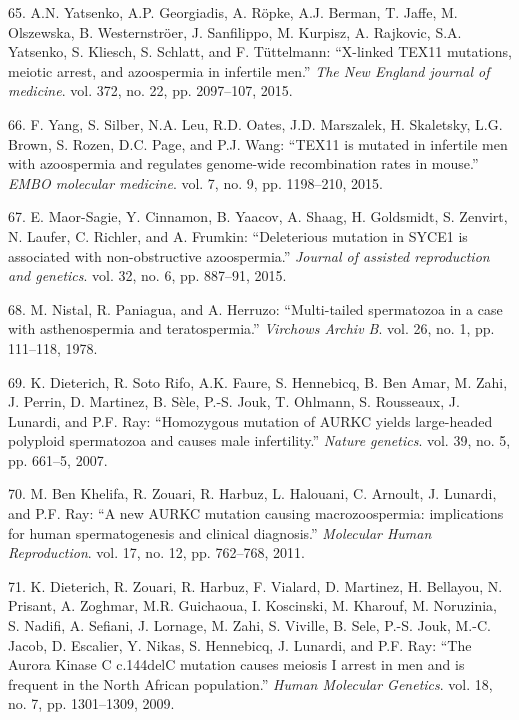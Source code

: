 \documentclass[12pt,a4paper,twoside]{ugathesis}
\theoremstyle{definition}
\theoremstyle{definition}
\theoremstyle{definition}
\theoremstyle{remark}
\begin{document}
\hypertarget{ref-Yatsenko2015}{}
65. A.N. Yatsenko, A.P. Georgiadis, A. Röpke, A.J. Berman, T. Jaffe, M.
Olszewska, B. Westernströer, J. Sanfilippo, M. Kurpisz, A. Rajkovic,
S.A. Yatsenko, S. Kliesch, S. Schlatt, and F. Tüttelmann: ``X-linked
TEX11 mutations, meiotic arrest, and azoospermia in infertile men.''
\emph{The New England journal of medicine}. vol. 372, no. 22, pp.
2097--107, 2015.

\hypertarget{ref-Yang2015}{}
66. F. Yang, S. Silber, N.A. Leu, R.D. Oates, J.D. Marszalek, H.
Skaletsky, L.G. Brown, S. Rozen, D.C. Page, and P.J. Wang: ``TEX11 is
mutated in infertile men with azoospermia and regulates genome-wide
recombination rates in mouse.'' \emph{EMBO molecular medicine}. vol. 7,
no. 9, pp. 1198--210, 2015.

\hypertarget{ref-Maor-Sagie2015}{}
67. E. Maor-Sagie, Y. Cinnamon, B. Yaacov, A. Shaag, H. Goldsmidt, S.
Zenvirt, N. Laufer, C. Richler, and A. Frumkin: ``Deleterious mutation
in SYCE1 is associated with non-obstructive azoospermia.'' \emph{Journal
of assisted reproduction and genetics}. vol. 32, no. 6, pp. 887--91,
2015.

\hypertarget{ref-Nistal}{}
68. M. Nistal, R. Paniagua, and A. Herruzo: ``Multi-tailed spermatozoa
in a case with asthenospermia and teratospermia.'' \emph{Virchows Archiv
B}. vol. 26, no. 1, pp. 111--118, 1978.

\hypertarget{ref-Dieterich2007}{}
69. K. Dieterich, R. Soto Rifo, A.K. Faure, S. Hennebicq, B. Ben Amar,
M. Zahi, J. Perrin, D. Martinez, B. Sèle, P.-S. Jouk, T. Ohlmann, S.
Rousseaux, J. Lunardi, and P.F. Ray: ``Homozygous mutation of AURKC
yields large-headed polyploid spermatozoa and causes male infertility.''
\emph{Nature genetics}. vol. 39, no. 5, pp. 661--5, 2007.

\hypertarget{ref-BenKhelifa2011}{}
70. M. Ben Khelifa, R. Zouari, R. Harbuz, L. Halouani, C. Arnoult, J.
Lunardi, and P.F. Ray: ``A new AURKC mutation causing macrozoospermia:
implications for human spermatogenesis and clinical diagnosis.''
\emph{Molecular Human Reproduction}. vol. 17, no. 12, pp. 762--768,
2011.

\hypertarget{ref-Dieterich2009}{}
71. K. Dieterich, R. Zouari, R. Harbuz, F. Vialard, D. Martinez, H.
Bellayou, N. Prisant, A. Zoghmar, M.R. Guichaoua, I. Koscinski, M.
Kharouf, M. Noruzinia, S. Nadifi, A. Sefiani, J. Lornage, M. Zahi, S.
Viville, B. Sele, P.-S. Jouk, M.-C. Jacob, D. Escalier, Y. Nikas, S.
Hennebicq, J. Lunardi, and P.F. Ray: ``The Aurora Kinase C c.144delC
mutation causes meiosis I arrest in men and is frequent in the North
African population.'' \emph{Human Molecular Genetics}. vol. 18, no. 7,
pp. 1301--1309, 2009.
\end{document}
